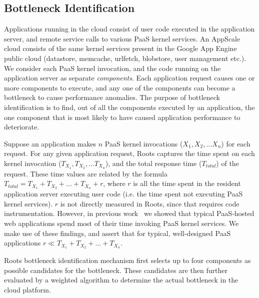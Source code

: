 \subsection{Bottleneck Identification}

Applications running in the cloud consist of user code executed in the application server, 
and remote service calls to various PaaS kernel services. An AppScale cloud
consists of the same kernel services present in the Google App Engine public cloud (datastore, memcache,
urlfetch, blobstore, user management etc.).
We consider each PaaS kernel invocation, and the code running on the application server as 
separate \textit{components}. Each application request causes one or more components to
execute, and any one of the components can become a bottleneck to cause performance anomalies.  
The purpose of bottleneck identification is to find, out of all
the components executed by an application, the one component that is most likely to have caused 
application performance to deteriorate.

Suppose an application makes $n$ PaaS kernel invocations ($X_1, X_2, ... X_n$) for each request. 
For any given application request,
Roots captures the time spent on each kernel invocation ($T_{X_1}, T_{X_2}, ... T_{X_n}$), and the 
total response time ($T_{total}$) of the request. These time values are related by the formula
$T_{total} = T_{X_1} + T_{X_2} + ... + T_{X_n} + r$, where $r$ is all the time spent in the resident 
application server executing user code (i.e. the time
spent not executing PaaS kernel services). $r$ is not
directly measured in Roots, since that requires code instrumentation.
However, in previous
work~\cite{Jayathilaka:2015:RTS:2806777.2806842} we showed that typical
PaaS-hosted web applications spend most of their time invoking PaaS kernel services.
We make use of these findings, and assert that for typical,
well-designed PaaS applications $r \ll T_{X_1} + T_{X_2} + ... + T_{X_n}$.

Roots bottleneck identification mechanism first
selects up to four components as possible candidates
for the bottleneck. These candidates are then further evaluated by a weighted algorithm to
determine the actual bottleneck in the cloud platform. 

